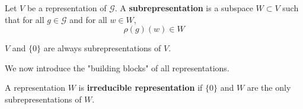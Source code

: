   \begin{definition}
    Let $V$ be a representation of $\mathcal{G}$. A \textbf{subrepresentation} is a subspace $W \subset V$ such that for all $g \in \mathcal{G}$ and for all $w \in W$, 
    \begin{equation}
      \rho(g)(w) \in W
    \end{equation}
  \end{definition}

  \begin{example}
    $V$ and $\{0\}$ are always subrepresentations of $V$. 
  \end{example}

  We now introduce the "building blocks" of all representations. 
  \begin{definition}
    A representation $W$ is \textbf{irreducible representation} if $\{0\}$ and $W$ are the only subrepresentations of $W$. 
  \end{definition}

